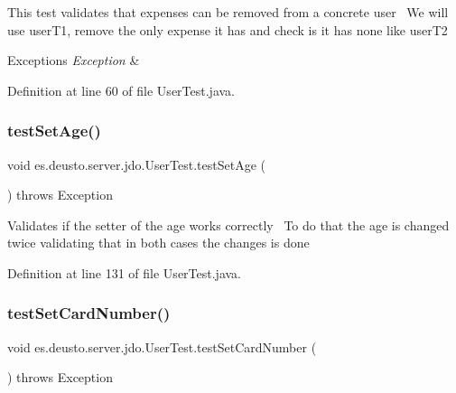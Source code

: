This test validates that expenses can be removed from a concrete user~\newline
We will use user\+T1, remove the only expense it has and check is it has none like user\+T2 
\begin{DoxyExceptions}{Exceptions}
{\em Exception} & \\
\hline
\end{DoxyExceptions}


Definition at line 60 of file User\+Test.\+java.

\mbox{\label{classes_1_1deusto_1_1server_1_1jdo_1_1_user_test_ac45f9cf087026405559dab8de89f1d66}} 
\subsubsection{\texorpdfstring{test\+Set\+Age()}{testSetAge()}}
{\footnotesize\ttfamily void es.\+deusto.\+server.\+jdo.\+User\+Test.\+test\+Set\+Age (\begin{DoxyParamCaption}{ }\end{DoxyParamCaption}) throws Exception}

Validates if the setter of the age works correctly~\newline
To do that the age is changed twice validating that in both cases the changes is done 

Definition at line 131 of file User\+Test.\+java.

\mbox{\label{classes_1_1deusto_1_1server_1_1jdo_1_1_user_test_a944d9dbc5220860bbc5a8eeaf013d54e}} 
\subsubsection{\texorpdfstring{test\+Set\+Card\+Number()}{testSetCardNumber()}}
{\footnotesize\ttfamily void es.\+deusto.\+server.\+jdo.\+User\+Test.\+test\+Set\+Card\+Number (\begin{DoxyParamCaption}{ }\end{DoxyParamCaption}) throws Exception}

